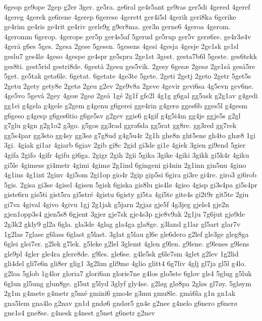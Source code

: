 {6geop
ge9ope
2gep
g2er
3ger.
ge5ra.
ge6ral
ge4r5ant
ge9ras
ger5di
4gered
4geref
4gereg
4gerek
ge6rene
4gerep
6gerese
4gerett
ger4i5d
4gerik
geri8ka
6gerike
ge4rim
ge4ris
ge4rit
ge4riv
gerle9g
g9er8ma.
ger3n
gerne6
4geroa
4gerom.
4geromm
6gerop.
4gerope
ger5p
ger4s5af
5gerud
ge5rup
ger5v
ger^^f86re.
ge4r3^^f84v
4ger^^e5
g6es
5ges.
2gesa
2gese
5gesen.
5gesens
4gesi
4gesja
4gesje
2ge1sk
ge1sl
geslu7
ges4l^^f8
4geso
4gespe
ge4spr
ge5spra
2ge1st
3gest.
gesta7b6l
5geste.
ges6tekk
ges8ti.
gest5rid
gestri8de.
6gest^^e5
2gesu
ges5vik.
2gesy
6ges^^e6
2ges^^f8
2ge1s^^e5
ges^^e55re
5get.
ge5tak
geta6le.
6getat.
6getate
4ge3te
5gete.
2geti
2getj
2geto
2getr
5get5s
2getu
2gety
gety8e
2get^^f8
2geu
g2ev
2ge9v8a
2geve
4gevir
gevi6sa
4g5evn
gev6ne.
4ge5vo
5gev^^e5
2gey
4ge^^e6
2ge^^f8
2ge^^e5
1g^^e9
2g1f
gfe2l
4g1g
g6gal
gg5ask
g2g1av
g4gedi
gg1ei
g4gela
g4gele
g2gem
g4genu
g6gerei
gge4rin
g4ger^^f8
gges6b
gges5l
g4gesm
g6geso
g4gesp
g6ges6tio
g6ge5sv
g2gev
ggie6
g4gif
g4g5i4m
gg4je
ggje5s
g2gl
g7glu
g4gn
g2g1o2
g3go.
g5gos
gg3rad
ggra6da
gg5rat
gg8re.
gg3red
gg7rek
gg5s4par
gg3sto
gg4sy
gg3s^^f8
g7g8ud
g4g5u4r
2g1h
ghe8n
ght5ene
gh4to
gh^^e68
1gi
3gi.
4giak
gi1ar
4giarb
6giav
2gib
gi8c
2gid
gi3de
gi1e
4giek
3gien
gi9end
5gier
4gifa
2gifo
4gifr
4gifu
gi6ga.
2gigr
2gih
2gii
5gika
3gike
4giki
3gikk
gi5k4r
4giku
gi5le
4gimess
gi4metr
4gimi
4gim^^f8
2g1ind
6gingeni
gi4nin
2g1inn
gin5nu
4gino
4g1ins
4g1int
2ginv
4gi5om
2gi1op
gio4r
2gip
gip5si
6gira
gi3re
gi4re.
giro3
gi6rob
5gis.
2gisa
gi3se
4gisel
4gisen
5gisk
6giska
gis8lu
gis4l^^f8
4giso
4gisp
gi3s4pa
gi5s4pr
giste6ru
gis5ti
gist5ra
gi5str^^e9
4gistu
6gisty
gi5ta
4gi5te
gite4s
gi2t9r
git5te
2giu
gi7va
4gival
4givo
4givu
1gj
2g1jak
g5jarn
2gjaz
gje5f
4g3jeg
gjels4
gje2n
gjen1opp3s4
gjen5s8
6gjent
3gjer
gje7sk
gje4s3p
gje8v9ak
2g1ju
7g6jut
gj^^f89de
2g3k2
gkly9
gl2a
6gla.
gla3de
4glag
gla4ga
gla8ge.
g3land
g1lar
gl5art
glar7v
1g2las
7glase
g6lass
6glast
g5last.
3glat
g5lau
gl6e
gle6dero
g2lef
gle3ge
gleg8ga
6glei
glei7er.
g2lek
g7lek.
g5leke
g2lel
3glemt
4glen
g9len.
g9lene.
g9lenes
g9lens
gle9pl
4gler
gle4ra
glere8de.
g9les.
gle6se.
g4le5sk
g6le7sm
4glet
g2lev
1g2lid
gli4del
gli7e6n
gli8er
glig1
3g2lim
gli9me
4glio
glitt4
6g7liv
4glj
gl7ja
gl5l
g4lo.
g2loa
5glob
1g4lor
gloria7
glori6an
glorie7ne
g4los
glo5ste
6glov
gls4
5glug
g5luk
6glun
gl5ung
glun8ge.
gl5ut
g5lyd
3glyf
gly4se.
g2l^^f8g
gl^^f88pa
2gl^^f8s
gl7^^f8y.
5gl^^f8ym
2g1m
g4mete
g4metr
g5m^^e9
gmini6
gmo4e
g3mu
gmu8le.
gm^^e56la
g1n
gn1ak
gna5lem
gna4lo
g2nav
gn1d
gnd^^f86
gnd^^f8r5
gn4e
g2nee
g4nelo
g6nero
g6ner^^f8
gne1s4
gne8se.
g4nesk
g4nest
g5net
g6netr
g2nev
}
